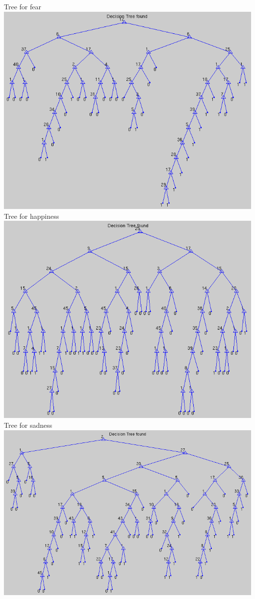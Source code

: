 \documentclass[12pt]{article}
\begin{document}
\begin{center}
  Tree for fear \\
  \vspace{\baselineskip}
  \includegraphics[scale=0.28]{report-images/tree4.png}
  Tree for happiness \\
  \vspace{\baselineskip}
  \includegraphics[scale=0.28]{report-images/tree5.png}
  Tree for sadness \\
  \vspace{\baselineskip}
  \includegraphics[scale=0.28]{report-images/tree6.png}

\end{center}
\end{document}
